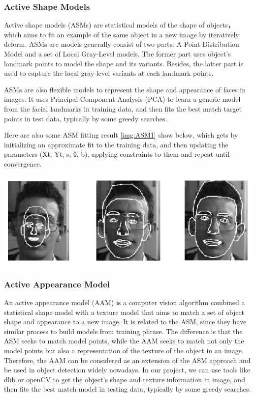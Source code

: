 \subsubsection{Active Shape Models}
Active shape models (ASMs)\cite{Reference10} are statistical models of the shape of objects， which aims to fit an example of the same object in a new image by iteratively deform. ASMs are models generally consist of two parts: A Point Distribution Model and a set of Local Gray-Level models. The former part uses object’s landmark points to model the shape and its variants. Besides, the latter part is used to capture the local gray-level variants at each landmark points. 

ASMs are also flexible models to represent the shape and appearance of faces in images. It uses Principal Component Analysis\cite{Reference11} (PCA) to learn a generic model from the facial landmarks in training data, and then fits the best match target points in test data, typically by some greedy searches.

Here are also some ASM fitting result \ref{img:ASM1} show below, which gets by initializing an approximate fit to the training data, and then updating the parameters (Xt, Yt, s, θ, b), applying constraints to them and repeat until convergence.

\begin{center}
\includegraphics[width=0.8\linewidth]{images/ASM1.png}\\[1cm]
\label{img:ASM1}
\end{center}

\subsubsection{Active Appearance Model}


An active appearance model \cite{Reference12}(AAM) is a computer vision algorithm combined a statistical shape model with a texture model that aims to match a set of object shape and appearance to a new image. It is related to the ASM, since they have similar process to build models from training phrase. The difference is that the ASM seeks to match model points, while the AAM seeks to match not only the model points but also a representation of the texture of the object in an image. Therefore, the AAM can be considered as an extension of the ASM approach and be used in object detection widely nowadays. In our project, we can use tools like dlib or openCV to get the object’s shape and texture information in image, and then fits the best match model in testing data, typically by some greedy searches. 

